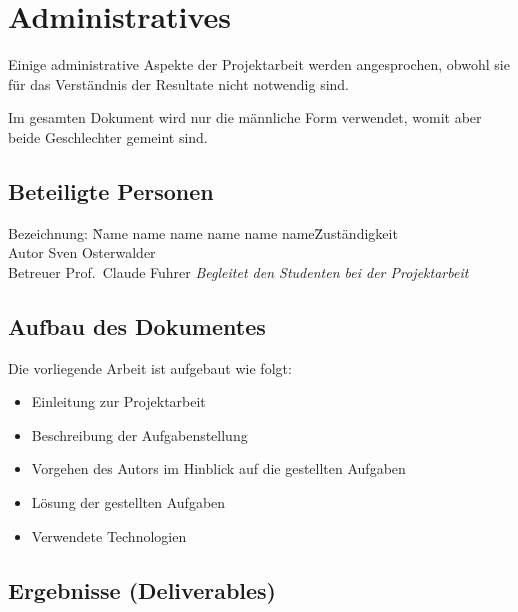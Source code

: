 
\chapter{Administratives}
\label{chap:20_administrative}

Einige administrative Aspekte der Projektarbeit werden angesprochen,
obwohl sie für das Verständnis der Resultate nicht notwendig sind.

Im gesamten Dokument wird nur die männliche Form verwendet, womit aber
beide Geschlechter gemeint sind.

\section{Beteiligte Personen}
\label{sec:involved_persons}

\begin{tabbing} %
Bezeichnung: \= Name name name name name name\= Zuständigkeit \kill \\
    Autor           \> Sven Osterwalder\protect\footnotemark[1]{}    \> \\
    Betreuer        \> Prof.\ Claude Fuhrer\protect\footnotemark[2]{}  \> \textit{Begleitet den Studenten bei der Projektarbeit}\\
\end{tabbing}

\section{Aufbau des Dokumentes}
\label{sec:document_structure}

Die vorliegende Arbeit ist aufgebaut wie folgt:
\begin{itemize}
    \item Einleitung zur Projektarbeit
    \item Beschreibung der Aufgabenstellung
    \item Vorgehen des Autors im Hinblick auf die gestellten Aufgaben
    \item Lösung der gestellten Aufgaben
    \item Verwendete Technologien
\end{itemize}

\section{Ergebnisse (Deliverables)}
\label{sec:deliverables}

